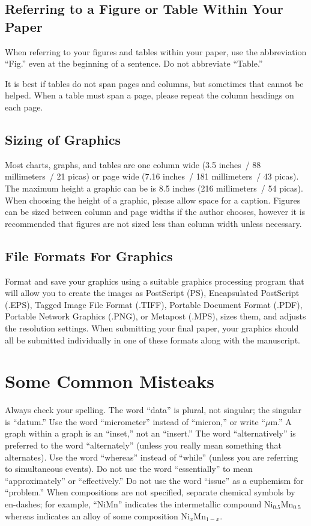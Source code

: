 \documentclass{IEEEtran}
\begin{document}
\subsection{Referring to a Figure or Table Within Your Paper}
\label{subsec:referring}
When referring to your figures and tables within your paper, use the
abbreviation ``Fig.'' even at the beginning of a sentence. Do not abbreviate
``Table.''

It is best if tables do not span pages and columns, but sometimes that
cannot be helped. When a table must span a page, please repeat the column
headings on each page.

\subsection{Sizing of Graphics}
Most charts, graphs, and tables are one column wide (3.5 inches~/ 88
millimeters~/ 21 picas) or page wide (7.16 inches~/ 181 millimeters~/ 43
picas). The maximum height a graphic can be is 8.5 inches (216 millimeters~/
54 picas). When choosing the height of a graphic, please allow space for a
caption. Figures can be sized between column and page widths if the author
chooses, however it is recommended that figures are not sized less than
column width unless necessary.

\subsection{File Formats For Graphics}\label{formats}
Format and save your graphics using a suitable graphics processing program
that will allow you to create the images as PostScript (PS), Encapsulated
PostScript (.EPS), Tagged Image File Format (.TIFF), Portable Document
Format (.PDF), Portable Network Graphics (.PNG), or Metapost (.MPS), sizes them, and adjusts
the resolution settings. When
submitting your final paper, your graphics should all be submitted
individually in one of these formats along with the manuscript.

\section{Some Common Misteaks}
Always check your spelling. The word ``data'' is plural, not singular; the
singular is ``datum.'' Use the word ``micrometer'' instead of ``micron,'' or
write ``$\mu $m.'' A graph within a graph is an ``inset,'' not an
``insert.'' The word ``alternatively'' is preferred to the word
``alternately'' (unless you really mean something that alternates). Use the
word ``whereas'' instead of ``while'' (unless you are referring to
simultaneous events). Do not use the word ``essentially'' to mean
``approximately'' or ``effectively.'' Do not use the word ``issue'' as a
euphemism for ``problem.'' When compositions are not specified, separate
chemical symbols by en-dashes; for example, ``NiMn'' indicates the intermetallic
compound Ni$_{0.5}$Mn$_{0.5}$ whereas  indicates an alloy of some
composition Ni$_{x}$Mn$_{1-x}$.
\end{document}

